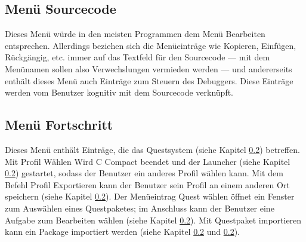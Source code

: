 \subsection{Menü \glqq{}Sourcecode\grqq{}}
\label{sec:gui-menu-code}
Dieses Menü würde in den meisten Programmen dem Menü \glqq{}Bearbeiten\grqq{} entsprechen. Allerdings beziehen sich die Menüeinträge wie \glqq{}Kopieren\grqq{}, \glqq{}Einfügen\grqq{}, \glqq{}Rückgängig\grqq{}, etc. immer auf das Textfeld für den Sourcecode --- mit dem Menünamen sollen also Verwechslungen vermieden werden --- und andererseits enthält dieses Menü auch Einträge zum Steuern des Debuggers. Diese Einträge werden vom Benutzer kognitiv mit dem Sourcecode verknüpft.

\subsection{Menü \glqq{}Fortschritt\grqq{}}
Dieses Menü enthält Einträge, die das Questsystem (siehe Kapitel \ref{}) betreffen. Mit \glqq{}Profil Wählen\grqq{} Wird C Compact beendet und der Launcher (siehe Kapitel \ref{}) gestartet, sodass der Benutzer ein anderes Profil wählen kann. Mit dem Befehl \glqq{}Profil Exportieren\grqq{} kann der Benutzer sein Profil an einem anderen Ort speichern (siehe Kapitel \ref{}). Der Menüeintrag \glqq{}Quest wählen\grqq{} öffnet ein Fenster zum Auswählen eines Questpaketes; im Anschluss kann der Benutzer eine Aufgabe zum Bearbeiten wählen (siehe Kapitel \ref{}). Mit \glqq{}Questpaket importieren\grqq{} kann ein Package importiert werden (siehe Kapitel \ref{} und \ref{}).

